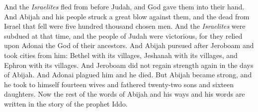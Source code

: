 \begin{biblechapter}
\verse And the \textit{Israelites} fled from before Judah, and God gave them into their hand.
\verse And Abijah and his people struck a great blow against them, and the dead from Israel that fell were five hundred thousand chosen men.
\verse And the \textit{Israelites} were subdued at that time, and the people of Judah were victorious, for they relied upon Adonai the God of their ancestors.
\verse And Abijah pursued after Jeroboam and took cities from him: Bethel with its villages, Jeshanah with its villages, and Ephron with its villages.
\verse And Jeroboam did not regain strength again in the days of Abijah. And Adonai plagued him and he died.
\verse But Abijah became strong, and he took to himself fourteen wives and fathered twenty-two sons and sixteen daughters.
\verse Now the rest of the words of Abijah and his ways and his words are written in the story of the prophet Iddo.
\end{biblechapter}

